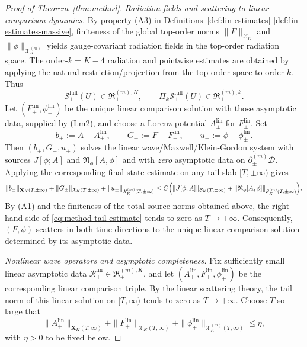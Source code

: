 \documentclass[11pt]{article}
\numberwithin{equation}{section}
\theoremstyle{plain}
\theoremstyle{definition}
\theoremstyle{remark}
\begin{document}
\begin{proof}[Proof of Theorem~\ref{thm:method}]
\smallskip
\noindent\emph{Radiation fields and scattering to linear comparison dynamics.}
By property \textup{(A3)} in Definitions~\ref{def:lin-estimates}-\ref{def:lin-estimates-massive}, finiteness of the global top-order norms $\|F\|_{\mathcal X_{K}}$ and $\|\phi\|_{\mathcal X_{K}^{(m)}}$ yields gauge-covariant radiation fields in the top-order radiation space. The order-$k=K-4$ radiation and pointwise estimates are obtained by applying the natural restriction/projection from the top-order space to order $k$.
Thus
\begin{equation}
\mathscr S_{\pm}^{\mathrm{full}}(U)\in\mathfrak R_{\pm}^{(m),K},
\qquad
\Pi_{k}\mathscr S_{\pm}^{\mathrm{full}}(U)\in\mathfrak R_{\pm}^{(m),k}.
\end{equation}
Let $(F_{\pm}^{\mathrm{lin}},\phi_{\pm}^{\mathrm{lin}})$ be the unique linear comparison solution with those asymptotic data, supplied by \textup{(Lm2)}, and choose a Lorenz potential $A_{\pm}^{\mathrm{lin}}$ for $F_{\pm}^{\mathrm{lin}}$. Set
\begin{equation}
b_{\pm}:=A-A_{\pm}^{\mathrm{lin}},
\qquad
G_{\pm}:=F-F_{\pm}^{\mathrm{lin}},
\qquad
u_{\pm}:=\phi-\phi_{\pm}^{\mathrm{lin}}.
\end{equation}
Then $(b_{\pm},G_{\pm},u_{\pm})$ solves the linear wave/Maxwell/Klein-Gordon system with sources $J[\phi;A]$ and $\mathfrak N_{\phi}[A,\phi]$ and with \emph{zero} asymptotic data on $\partial_{\pm}^{(m)}\mathcal D$. Applying the corresponding final-state estimate on any tail slab $[T,\pm\infty)$ gives
\begin{equation}\label{eq:method-tail-estimate}
\|b_{\pm}\|_{\mathbf X_{K}(T,\pm\infty)}
+\|G_{\pm}\|_{\mathcal X_{K}(T,\pm\infty)}
+\|u_{\pm}\|_{\mathcal X_{K}^{(m)}(T,\pm\infty)}
\le
C\Bigl(
\|J[\phi;A]\|_{\mathcal S_{K}(T,\pm\infty)}
+
\|\mathfrak N_{\phi}[A,\phi]\|_{\mathcal S_{K}^{(m)}(T,\pm\infty)}
\Bigr).
\end{equation}
By \textup{(A1)} and the finiteness of the total source norms obtained above, the right-hand side of \eqref{eq:method-tail-estimate} tends to zero as $T\to\pm\infty$. Consequently, $(F,\phi)$ scatters in both time directions to the unique linear comparison solution determined by its asymptotic data.

\smallskip
\noindent\emph{Nonlinear wave operators and asymptotic completeness.}
Fix sufficiently small linear asymptotic data $\mathcal R_{+}^{\mathrm{lin}}\in\mathfrak R_{+}^{(m),K}$, and let $(A_{+}^{\mathrm{lin}},F_{+}^{\mathrm{lin}},\phi_{+}^{\mathrm{lin}})$ be the corresponding linear comparison triple. By the linear scattering theory, the tail norm of this linear solution on $[T,\infty)$ tends to zero as $T\to+\infty$. Choose $T$ so large that
\begin{equation}
\|A_{+}^{\mathrm{lin}}\|_{\mathbf X_{K}(T,\infty)}
+\|F_{+}^{\mathrm{lin}}\|_{\mathcal X_{K}(T,\infty)}
+\|\phi_{+}^{\mathrm{lin}}\|_{\mathcal X_{K}^{(m)}(T,\infty)}
\le \eta,
\end{equation}
with $\eta>0$ to be fixed below.


\end{proof}
\end{document}
